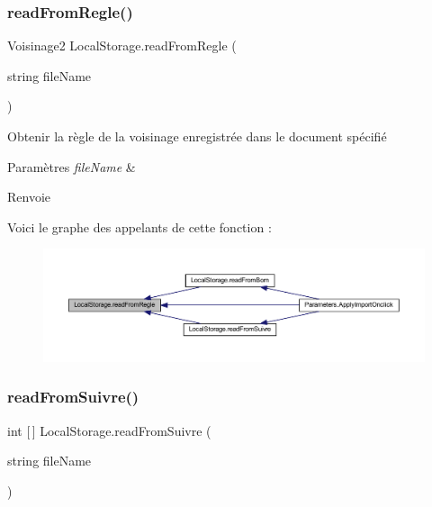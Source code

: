 \subsubsection{\texorpdfstring{read\+From\+Regle()}{readFromRegle()}}
{\footnotesize\ttfamily Voisinage2 Local\+Storage.\+read\+From\+Regle (\begin{DoxyParamCaption}\item[{string}]{file\+Name }\end{DoxyParamCaption})\hspace{0.3cm}{\ttfamily [inline]}}



Obtenir la règle de la voisinage enregistrée dans le document spécifié 


\begin{DoxyParams}{Paramètres}
{\em file\+Name} & \\
\hline
\end{DoxyParams}
\begin{DoxyReturn}{Renvoie}

\end{DoxyReturn}
Voici le graphe des appelants de cette fonction \+:\nopagebreak
\begin{figure}[H]
\begin{center}
\leavevmode
\includegraphics[width=350pt]{class_local_storage_afbd7328c28fa47b11fcc174da3cc8ec1_icgraph}
\end{center}
\end{figure}
\mbox{\label{class_local_storage_a0c0003569be45cff5fda794e42243c1e}} 
\subsubsection{\texorpdfstring{read\+From\+Suivre()}{readFromSuivre()}}
{\footnotesize\ttfamily int \mbox{[}$\,$\mbox{]} Local\+Storage.\+read\+From\+Suivre (\begin{DoxyParamCaption}\item[{string}]{file\+Name }\end{DoxyParamCaption})\hspace{0.3cm}{\ttfamily [inline]}}



